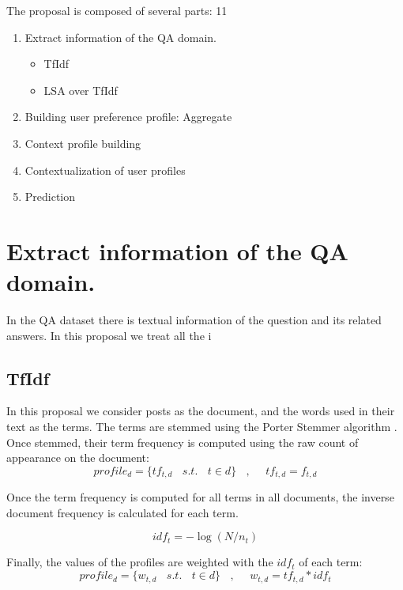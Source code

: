 \documentclass[preprint]{elsarticle}
\begin{document}
\begin{spacing}{2}
The proposal is composed of several parts:
11
\begin{enumerate}
	\item Extract information of the QA domain.
	\begin{itemize}
		\item TfIdf
		\item LSA over TfIdf
	\end{itemize}
	\item Building user preference profile: Aggregate 
	\item Context profile building
	\item Contextualization of user profiles
	\item Prediction
\end{enumerate}


\section{Extract information of the QA domain.}

In the QA dataset there is textual information of the question and its related answers. In this proposal we treat all the i

\subsection{TfIdf}

In this proposal we consider posts as the document, and the words used in their text as the terms. The terms are stemmed using the Porter Stemmer algorithm \citep{Porter1980}. Once stemmed, their term frequency is computed using the raw count of appearance on the document:
\begin{equation}
	profile_{d} = \{tf_{t,d}~~~~s.t.~~~~ t \in d \} ~~~~,  ~~~~~~
	tf_{t,d} = f_{t,d}
\end{equation}

Once the term frequency is computed for all terms in all documents, the inverse document frequency is calculated for each term.

\begin{equation}
	idf_t = - \log( N / n_t )
\end{equation}

Finally, the values of the profiles are weighted with the $idf_t$ of each term:
\begin{equation}
	profile_d = \{w_{t,d} ~~~~s.t. ~~~~t\in d\} ~~~~,  ~~~~~~
	w_{t,d} = tf_{t,d}*idf_t
\end{equation}


\end{spacing}
\end{document}
